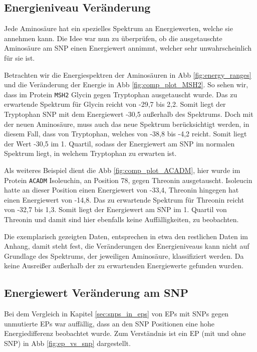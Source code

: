 \subsection{Energieniveau Veränderung}
Jede Aminosäure hat ein spezielles Spektrum an Energiewerten, welche sie annehmen kann. Die Idee war nun zu überprüfen, ob die ausgetauschte Aminosäure am \ac{SNP} einen Energiewert annimmt, welcher sehr unwahrscheinlich für sie ist.

Betrachten wir die Energiespektren der Aminosäuren in \ac{Abb} \ref{fig:energy_ranges} und die Veränderung der Energie in \ac{Abb} \ref{fig:comp_plot_MSH2}. So sehen wir, dass im Protein \texttt{MSH2} Glycin gegen Tryptophan ausgetauscht wurde. Das zu erwartende Spektrum für Glycin reicht von -29,7 bis 2,2. Somit liegt der Tryptophan \ac{SNP} mit dem Energiewert -30,5 außerhalb des Spektrums. Doch mit der neuen Aminosäure, muss auch das neue Spektrum berücksichtigt werden, in diesem Fall, dass von Tryptophan, welches von -38,8 bis -4,2 reicht. Somit liegt der Wert -30,5 im 1. Quartil, sodass der Energiewert am \ac{SNP} im normalen Spektrum liegt, in welchem Tryptophan zu erwarten ist.

Als weiteres Beispiel dient die \ac{Abb} \ref{fig:comp_plot_ACADM}, hier wurde im Protein \texttt{ACADM} Isoleuchin, an Position 78, gegen Threonin ausgetauscht. Isoleucin hatte an dieser Position einen Energiewert von -33,4, Threonin hingegen hat einen Energiewert von -14,8. Das zu erwartende Spektrum für Threonin reicht von -32,7 bis 1,3. Somit liegt der Energiewert am \ac{SNP} im 1. Quartil von Threonin und damit sind hier ebenfalls keine Auffälligkeiten, zu beobachten.

Die exemplarisch gezeigten Daten, entsprechen in etwa den restlichen Daten im Anhang, damit steht fest, die Veränderungen des Energieniveaus kann nicht auf Grundlage des Spektrums, der jeweiligen Aminosäure, klassifiziert werden. Da keine Ausreißer außerhalb der zu erwartenden Energiewerte gefunden wurden. 


\subsection{Energiewert Veränderung am SNP}
Bei dem Vergleich in Kapitel \ref{sec:snps_in_eps} von \ac{EP}s mit \ac{SNP}s gegen unmutierte \ac{EP}s war auffällig, dass an den \ac{SNP} Positionen eine hohe Energiedifferenz beobachtet wurde.
Zum Verständnis ist ein \ac{EP} (mit und ohne \ac{SNP}) in \ac{Abb} \ref{fig:ep_vs_snp} dargestellt.

